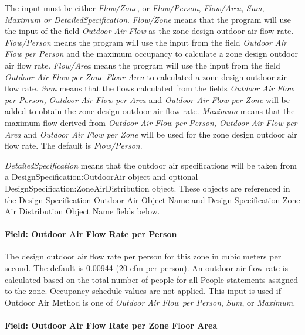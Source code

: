 The input must be either \emph{Flow/Zone}, or \emph{Flow/Person}, \emph{Flow/Area}, \emph{Sum}, \emph{Maximum or DetailedSpecification}. \emph{Flow/Zone} means that the program will use the input of the field \emph{Outdoor Air Flow} as the zone design outdoor air flow rate. \emph{Flow/Person} means the program will use the input from the field \emph{Outdoor Air Flow per Person} and the maximum occupancy to calculate a zone design outdoor air flow rate. \emph{Flow/Area} means the program will use the input from the field \emph{Outdoor Air Flow per Zone Floor Area} to calculated a zone design outdoor air flow rate. \emph{Sum} means that the flows calculated from the fields \emph{Outdoor Air Flow per Person,} \emph{Outdoor Air Flow per Area} and \emph{Outdoor Air Flow per Zone} will be added to obtain the zone design outdoor air flow rate. \emph{Maximum} means that the maximum flow derived from \emph{Outdoor Air Flow per Person,} \emph{Outdoor Air Flow per Area} and \emph{Outdoor Air Flow per Zone} will be used for the zone design outdoor air flow rate. The default is \emph{Flow/Person}.

\emph{DetailedSpecification} means that the outdoor air specifications will be taken from a DesignSpecification:OutdoorAir object and optional DesignSpecification:ZoneAirDistribution object. These objects are referenced in the Design Specification Outdoor Air Object Name and Design Specification Zone Air Distribution Object Name fields below.

\paragraph{Field: Outdoor Air Flow Rate per Person}\label{field-outdoor-air-flow-rate-per-person-1}

The design outdoor air flow rate per person for this zone in cubic meters per second. The default is 0.00944 (20 cfm per person). An outdoor air flow rate is calculated based on the total number of people for all People statements assigned to the zone. Occupancy schedule values are not applied. This input is used if Outdoor Air Method is one of \emph{Outdoor Air Flow per Person}, \emph{Sum}, or \emph{Maximum.}

\paragraph{Field: Outdoor Air Flow Rate per Zone Floor Area}\label{field-outdoor-air-flow-rate-per-zone-floor-area-1}

